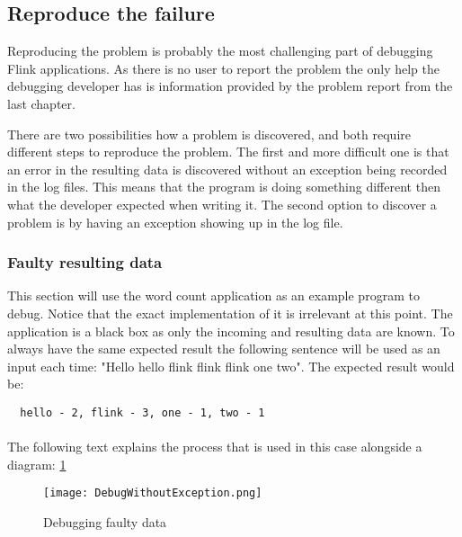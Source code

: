 \subsection{Reproduce the failure}
Reproducing the problem is probably the most challenging part of debugging Flink applications. As there is no user to report the problem the only help the debugging developer has is information provided by the problem report from the last chapter.

There are two possibilities how a problem is discovered, and both require different steps to reproduce the problem. The first and more difficult one is that an error in the resulting data is discovered without an exception being recorded in the log files. This means that the program is doing something different then what the developer expected when writing it. The second option to discover a problem is by having an exception showing up in the log file.

\subsubsection{Faulty resulting data}
This section will use the word count application as an example program to debug. Notice that the exact implementation of it is irrelevant at this point. The application is a black box as only the incoming and resulting data are known. To always have the same expected result the following sentence will be used as an input each time: "Hello hello flink flink flink one two". The expected result would be:
\begin{lstlisting}
  hello - 2, flink - 3, one - 1, two - 1
\end{lstlisting}

\paragraph{} The following text explains the process that is used in this case alongside a diagram: \ref{debuggingFaultyData}

\begin{figure}[h!]
    \centering
      \texttt{[image: DebugWithoutException.png]}
      \caption{Debugging faulty data}
      \label{debuggingFaultyData}
\end{figure}

